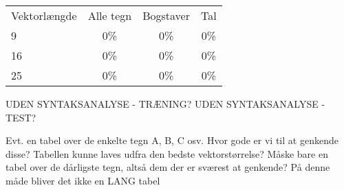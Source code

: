 \begin{tabular}{|l|c|c|c|}\hline
\rowcolor[gray]{0.9} \multicolumn{4}{|>{\columncolor[gray]{0.9}}c|}{\textbf{Kontrolsæt}} \\ \hline
Vektorlængde & Alle tegn & Bogstaver & Tal \\\hline
9 & 0\% & 0\% & 0\% \\\hline
16 & 0\% & 0\% & 0\% \\\hline
25 & 0\% & 0\% & 0\% \\\hline \end{tabular}


\begin{comment}
Syntaks analyse: Hvilke hits bliver valgt på hitlisterne af syntaksanalysen (sæt maxhitno højt):

\begin{tabular}{|l|c|}\hline
\multicolumn{2}{|l|}{Træningssæt} \\\hline
Hitnr. & Valgt \\\hline
1 & 95,4\% \\\hline
2 & 3\% \\\hline
3 & 0\% \\\hline
4 & 0\% \\\hline
5 & 0\% \\\hline
6 & 0\% \\\hline \end{tabular}

\begin{tabular}{|l|c|}\hline
\multicolumn{2}{|l|}{Kontrolsæt} \\\hline
Hitnr. & Valgt \\\hline
1 & 92,9\% \\\hline
2 & 0\% \\\hline
3 & 0\% \\\hline
4 & 0\% \\\hline
5 & 0\% \\\hline
6 & 0\% \\\hline \end{tabular}

\end{comment}

UDEN SYNTAKSANALYSE - TRÆNING?
UDEN SYNTAKSANALYSE - TEST?

Evt. en tabel over de enkelte tegn A, B, C osv. Hvor gode er vi til at genkende disse? Tabellen kunne laves udfra den bedste vektorstørrelse? Måske bare en tabel over de dårligste tegn, altså dem der er sværest at genkende? På denne måde bliver det ikke en LANG tabel


